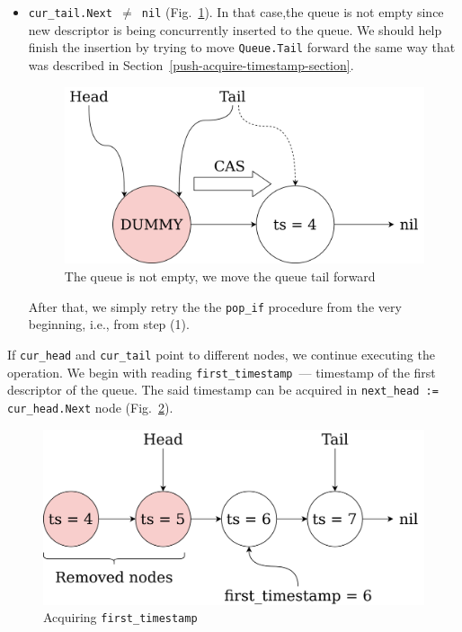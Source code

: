 \documentclass[times, dvipsnames,%
               languages={russian,english} %
              ]{itmo-student-thesis}
\begin{document}
\begin{nenum}
\begin{itemize}
        \item \texttt{cur\_tail.Next $\neq$ nil} (Fig.~\ref{queue-pop-restart-pic}). In that case,the  queue is not empty since new descriptor is being concurrently inserted to the queue. We should help finish the insertion by trying to move \texttt{Queue.Tail} forward the same way that was described in Section~\ref{push-acquire-timestamp-section}. 
        
        \begin{figure}[H]
          \centering
          \caption{The queue is not empty, we move the queue tail forward}
          \label{queue-pop-restart-pic}
          \includegraphics[width=0.7\linewidth]{pics/queue-pop-restart.png}
        \end{figure}
        
        After that, we simply retry the the \texttt{pop\_if} procedure from the very beginning, i.e., from step (1).
    \end{itemize}
    
    \item If \texttt{cur\_head} and \texttt{cur\_tail} point to different nodes, we continue executing the operation. We begin with reading \texttt{first\_timestamp}~--- timestamp of the first descriptor of the queue. The said timestamp can be acquired in \texttt{next\_head := cur\_head.Next} node (Fig.~\ref{pop-structure-pic}).
    
     \begin{figure}[H]
      \centering
      \caption{Acquiring \texttt{first\_timestamp}}
      \label{pop-structure-pic}
      \includegraphics[width=\linewidth]{pics/pop-structure.png}
    \end{figure}
    

\end{nenum}
\end{document}

